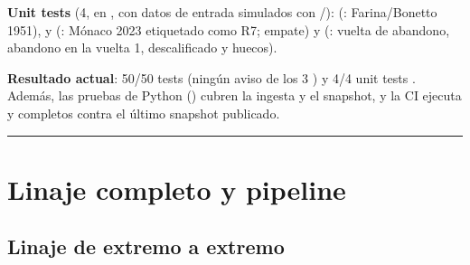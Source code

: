 \textbf{Unit tests} (4, en , con datos de entrada simulados con /):  (: Farina/Bonetto 1951),  y  (: Mónaco 2023 etiquetado como R7; empate) y  (: vuelta de abandono, abandono en la vuelta 1, descalificado y huecos).

\textbf{Resultado actual}: 50/50 tests  (ningún aviso de los 3 ) y 4/4 unit tests . Además, las pruebas de Python () cubren la ingesta y el snapshot, y la CI ejecuta  y  completos contra el último snapshot publicado.

\medskip\noindent\textcolor{muted!40}{\rule{\linewidth}{0.3pt}}\medskip

\section{Linaje completo y pipeline}

\subsection{Linaje de extremo a extremo}

